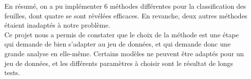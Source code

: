 En résumé, on a pu implémenter 6 méthodes différentes pour la classification des feuilles, dont quatre se sont révélées efficaces. En revanche, deux autres méthodes étaient inadaptés à notre problème.\\

Ce projet nous a permis de constater que le choix de la méthode est une étape qui demande de bien s'adapter au jeu de données, et qui demande donc une grande analyse en elle-même. Certains modèles ne peuvent être adaptés pour un jeu de données, et les différents paramètres à choisir sont le résultat de longs tests.